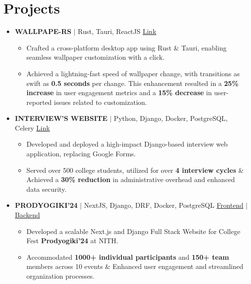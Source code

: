 \documentclass[legalpaper,10.8pt]{article}
\begin{document}
\section{Projects}
\begin{itemize}[leftmargin=*]
\item \textbf{WALLPAPE-RS} $|$ Rust, Tauri, ReactJS  \hfill \href{https://github.com/swastkk/wallpape-rs}{Link}
{\small
\begin{itemize}[label=$\diamond$,itemsep=0pt]
    \item Crafted a cross-platform desktop app using Rust \& Tauri, enabling seamless wallpaper customization with a click.
    \item Achieved a lightning-fast speed of wallpaper change, with transitions as swift as \textbf{0.5 seconds} per change. This enhancement resulted in a \textbf{25\% increase} in user engagement metrics and a \textbf{15\% decrease} in user-reported issues related to customization.
\end{itemize}
}

\item \textbf{INTERVIEW'S WEBSITE} $|$ Python, Django, Docker, PostgreSQL, Celery  \hfill \href{https://github.com/istenith/join.istenith.com}{Link}
{\small
\begin{itemize}[label=$\diamond$]
    \item Developed and deployed a high-impact Django-based interview web application, replacing Google Forms.
    \item Served over 500 college students, utilized for over \textbf{4 interview cycles} \& Achieved a \textbf{30\% reduction} in administrative overhead and enhanced data security.
\end{itemize}
}

\item \textbf{PRODYOGIKI'24} $|$ NextJS, Django, DRF, Docker, PostgreSQL \hfill \href{https://github.com/istenith/prody-frontend}{Frontend} $|$ \href{https://github.com/istenith/prody-backend}{Backend}
{\small
\begin{itemize}[label=$\diamond$]
    \item Developed a scalable Next.js and Django Full Stack Website for College Fest \textbf{Prodyogiki'24} at NITH.
    \item Accommodated \textbf{1000+ individual participants} and \textbf{150+ team} members across 10 events \& Enhanced user engagement and streamlined organization processes.
\end{itemize}
}
\end{itemize}
\end{document}
